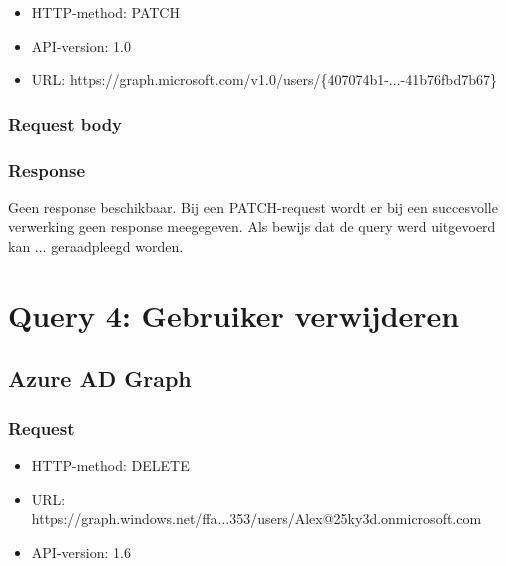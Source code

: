 \begin{itemize}
    \item \Ac{HTTP}-method: PATCH
    \item \ac{API}-version: 1.0
    \item \Ac{URL}: https://graph.microsoft.com/v1.0/users/\{407074b1-...-41b76fbd7b67\}
\end{itemize}

\subsubsection{Request body}


\subsubsection{Response}

Geen response beschikbaar. Bij een PATCH-request wordt er bij een succesvolle verwerking geen response meegegeven. Als bewijs dat de query werd uitgevoerd kan ... geraadpleegd worden. %

\clearpage

\section{Query 4: Gebruiker verwijderen}

\subsection{Azure AD Graph}

\subsubsection{Request}

\begin{itemize}
    \item \Ac{HTTP}-method: DELETE
    \item \ac{URL}: https://graph.windows.net/ffa...353/users/Alex@25ky3d.onmicrosoft.com
    \item \Ac{API}-version: 1.6
\end{itemize}

